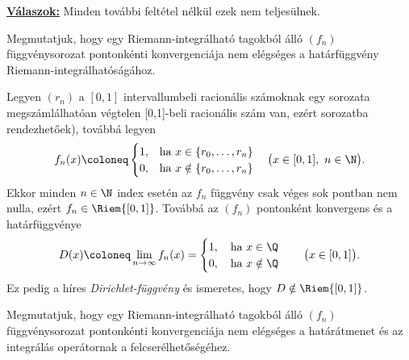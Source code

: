 \documentclass[
]{elteikthesis}[2024/04/26]
\begin{document}
	\noindent
	\underline{\textbf{Válaszok:}} Minden további feltétel nélkül ezek nem teljesülnek.
	
	Megmutatjuk, hogy egy Riemann-integrálható tagokból álló \( (f_n) \) függvénysorozat pontonkénti konvergenciája nem elégséges a határfüggvény Riemann-integrálhatóságához.
	
	Legyen \( (r_n) \) a \( [0, 1] \) intervallumbeli racionális számoknak egy sorozata megszámlálhatóan végtelen [0,1]-beli racionális szám van, ezért sorozatba rendezhetőek), továbbá legyen
	\[
		f_n(x) \coloneq 
		\begin{cases}
			1, & \text{ha } x \in    \{ r_0, \dots, r_n \} \\
			0, & \text{ha } x \notin \{ r_0, \dots, r_n \}
		\end{cases}
		\quad \bigl( x \in [0, 1],\ n \in \N \bigr).
	\]
	Ekkor minden \( n \in \N \) index esetén az \( f_n \) függvény csak véges sok pontban nem nulla, ezért \( f_n \in \Riem{[0, 1]} \).
	Továbbá az \( (f_n) \) pontonként konvergens és a határfüggvénye
	\[
		D(x) \coloneq 
		\lim_{n \to \infty} f_n(x) =
		\begin{cases}
			1, \quad \text{ha } x \in    \Q \\
			0, \quad \text{ha } x \notin \Q
		\end{cases}
		\quad \bigl( x \in [0, 1] \bigr).
	\]
	Ez pedig a híres \emph{Dirichlet-függvény} és ismeretes, hogy \( D \notin \Riem{[0, 1]} \).
	
	Megmutatjuk, hogy egy Riemann-integrálható tagokból álló \( (f_n) \) függvénysorozat pontonkénti konvergenciája nem elégséges a határátmenet és az integrálás operátornak a felcserélhetőségéhez.
	
\end{document}
